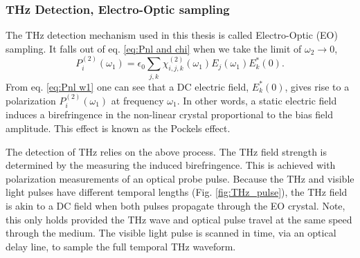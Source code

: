 \subsubsection{THz Detection, Electro-Optic sampling} \label{sec:THz_det}
The THz detection mechanism used in this thesis is called Electro-Optic (EO) sampling. It falls out of eq. \eqref{eq:Pnl and chi} when we take the limit of $\omega_2 \to 0$,
\begin{equation}
P^{(2)}_i(\omega_1)=\epsilon_0 \sum_{j,k}\chi_{i,j,k}^{(2)}(\omega_1) E_j(\omega_1)E_k^{*}(0).
\label{eq:Pnl w1}
\end{equation}
From eq. \eqref{eq:Pnl w1} one can see that a DC electric field, $E_k^{*}(0)$, gives rise to a polarization $P^{(2)}_i(\omega_1)$ at frequency $\omega_1$. In other words, a static electric field induces a birefringence in the non-linear crystal proportional to the bias field amplitude. This effect is known as the Pockels effect. 

The detection of THz relies on the above process. The THz field strength is determined by the measuring the induced birefringence. This is achieved with polarization measurements of an optical probe pulse. Because the THz and visible light pulses have different temporal lengths (Fig. \ref{fig:THz_pulse}), the THz field is akin to a DC field when both pulses propagate through the EO crystal. Note, this only holds provided the THz wave and optical pulse travel at the same speed through the medium. The visible light pulse is scanned in time, via an optical delay line, to sample the full temporal THz waveform.



